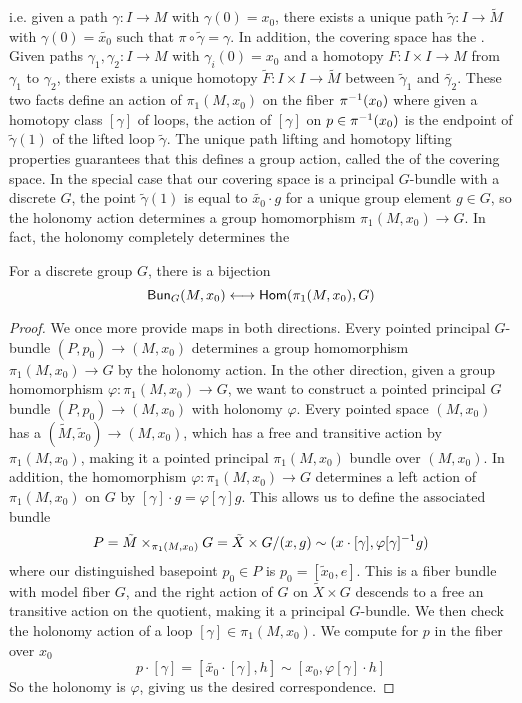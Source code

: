 i.e. given a path $\gamma : I \to M$ with $\gamma(0) = x_0$, there exists a
unique path $\tilde{\gamma} : I \to \tilde{M}$ with $\gamma(0) = \tilde{x_0}$
such that $\pi \circ \tilde{\gamma} = \gamma$. In addition, the covering
space has the . Given paths
$\gamma_1, \gamma_2 : I \to M$ with $\gamma_i(0) = x_0$ and a homotopy
$F : I \times I \to M$ from $\gamma_1$ to $\gamma_2$, there exists a unique
homotopy $\tilde{F} : I \times I \to \tilde{M}$ between $\tilde{\gamma}_1$
and $\tilde{\gamma_2}$. These two facts define an action of $\pi_1(M, x_0)$
on the fiber $\pi^{-1}(x_0)$ where given a homotopy class $[\gamma]$ of
loops, the action of $[\gamma]$ on $p \in \pi^{-1}(x_0)$ is the endpoint
of $\tilde{\gamma}(1)$ of the lifted loop $\tilde{\gamma}$. The unique
path lifting and homotopy lifting properties guarantees that this defines
a group action, called the  of the covering space. In the
special case that our covering space is a principal $G$-bundle with a discrete $G$,
the point $\tilde{\gamma}(1)$ is equal to $\tilde{x_0} \cdot g$ for a unique
group element $g \in G$, so the holonomy action determines a group homomorphism
$\pi_1(M, x_0) \to G$. In fact, the holonomy completely determines the
%
\begin{thm}
For a discrete group $G$, there is a bijection
\[
\mathsf{Bun}_G(M,x_0) \longleftrightarrow \mathsf{Hom}(\pi_1(M,x_0), G)
\]
\end{thm}
%
\begin{proof}
We once more provide maps in both directions. Every pointed principal $G$-bundle
$(P,p_0) \to (M, x_0)$ determines a group homomorphism $\pi_1(M,x_0) \to G$
by the holonomy action. In the other direction, given a group homomorphism
$\varphi : \pi_1(M, x_0) \to G$, we want to construct a pointed principal $G$
bundle $(P, p_0) \to (M, x_0)$ with holonomy $\varphi$. Every pointed space
$(M, x_0)$ has a  $(\tilde{M}, \tilde{x}_0) \to (M,x_0)$,
which has a free and transitive action by $\pi_1(M,x_0)$, making it a pointed
principal $\pi_1(M,x_0)$ bundle over $(M,x_0)$. In addition, the homomorphism
$\varphi : \pi_1(M, x_0) \to G$ determines a left action of $\pi_1(M,x_0)$
on $G$ by $[\gamma] \cdot g = \varphi[\gamma] g$. This allows us to define
the associated bundle
\[
P = \tilde{M} \times_{\pi_1(M, x_0)} G = \tilde{X} \times G
/ (x,g) \sim (x \cdot [\gamma], \varphi[\gamma]^{-1} g)
\]
where our distinguished basepoint $p_0 \in P$ is $p_0 = [\tilde{x}_0, e]$.
This is a fiber bundle with model fiber $G$, and the right action of $G$
on $\tilde{X} \times G$ descends to a free an transitive action on the quotient,
making it a principal $G$-bundle. We then check the holonomy action of a
loop $[\gamma] \in \pi_1(M, x_0)$. We compute for $p$ in the fiber over $x_0$
\[
p \cdot [\gamma] = [\tilde{x_0} \cdot [\gamma], h] \sim [x_0, \varphi[\gamma]\cdot h]
\]
So the holonomy is $\varphi$, giving us the desired correspondence.
\end{proof}

